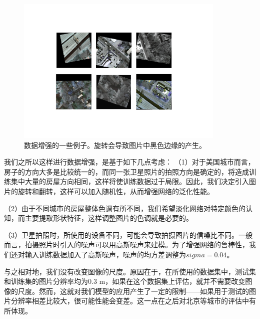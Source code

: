 \documentclass[a4paper,12pt]{article}
\begin{document}
\begin{CJK*}{UTF8}{gbsn}
\begin{spacing}{1.2}
    \begin{figure} [!]
    \centering
    \includegraphics[width=10.0cm]{DataAug.pdf}
    \caption{数据增强的一些例子。旋转会导致图片中黑色边缘的产生。}
    \label{fig:Fig 1}
    \end{figure}
    我们之所以这样进行数据增强，是基于如下几点考虑：
    （1）对于美国城市而言，房子的方向大多是比较统一的，而同一张卫星照片的拍照方向是确定的，将造成训练集中大量的房屋方向相同，这样将使训练数据过于局限。因此，我们决定引入图片的旋转和翻转，这样可以加入随机性，从而增强网络的泛化性能。
    
    （2）由于不同城市的房屋整体色调有所不同，我们希望淡化网络对特定颜色的认知，而主要提取形状特征，这样调整图片的色调就是必要的。
    
    （3）卫星拍照时，所使用的设备不同，可能会导致拍摄图片的信噪比不同。一般而言，拍摄照片时引入的噪声可以用高斯噪声来建模。为了增强网络的鲁棒性，我们还对输入训练数据加入了高斯噪声，噪声的均方差调整为$sigma=0.04$。
    
    与之相对地，我们没有改变图像的尺度。原因在于，在所使用的数据集中，测试集和训练集的图片分辨率均为$0.3$ m，如果在这个数据集上评估，就并不需要改变图像的尺度。然而，这就对我们模型的应用产生了一定的限制——如果用于测试的图片分辨率相差比较大，很可能性能会变差。这一点在之后对北京等城市的评估中有所体现。





\end{spacing}
\end{CJK*}
\end{document}
